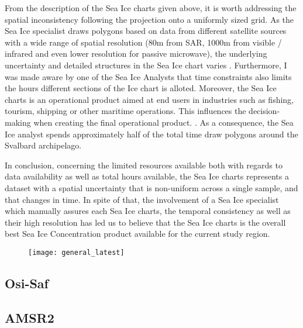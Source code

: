 \documentclass[../main/thesis.tex]{subfiles}
\begin{document}
From the description of the Sea Ice charts given above, it is worth addressing the spatial inconsistency following the projection onto a uniformly sized grid. As the Sea Ice specialist draws polygons based on data from different satellite sources with a wide range of spatial resolution (80m from SAR, 1000m from visible / infrared and even lower resolution for passive microwave), the underlying uncertainty and detailed structures in the Sea Ice chart varies \cite{MOI2015}. Furthermore, I was made aware by one of the Sea Ice Analysts that time constraints also limits the hours different sections of the Ice chart is alloted. Moreover, the Sea Ice charts is an operational product aimed at end users in industries such as fishing, tourism, shipping or other maritime operations. This influences the decision-making when creating the final operational product. . As a consequence, the Sea Ice analyst spends approximately half of the total time draw polygons around the Svalbard archipelago. 

In conclusion, concerning the limited resources available both with regards to data availability as well as total hours available, the Sea Ice charts represents a dataset with a spatial uncertainty that is non-uniform across a single sample, and that changes in time. In spite of that, the involvement of a Sea Ice specialist which manually assures each Sea Ice charts, the temporal consistency as well as their high resolution has led us to believe that the Sea Ice charts is the overall best Sea Ice Concentration product available for the current study region.

\begin{figure}
    \texttt{[image: general\_latest]}
\end{figure}

\subsection{Osi-Saf}

\subsection{AMSR2}
\end{document}
